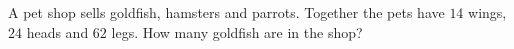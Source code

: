 A pet shop sells goldfish, hamsters and parrots. Together the pets have $14$ wings, $24$ heads and $62$ legs. How many goldfish are in the shop?
